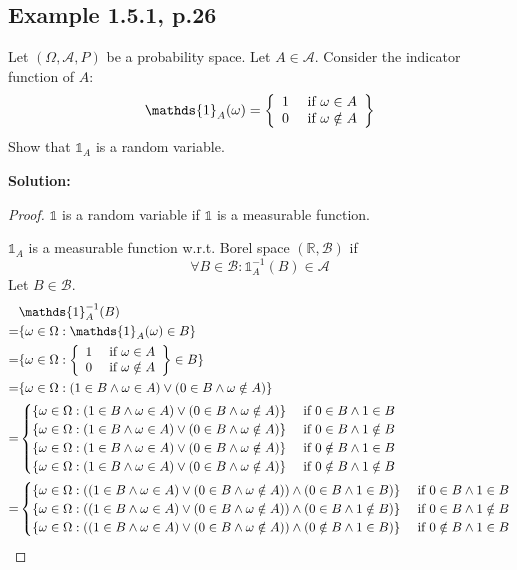 \documentclass{article}
\begin{document}
\subsection{Example 1.5.1, p.26}

Let \((\Omega,\mathcal{A},P)\) be a probability space.
Let \(A\in \mathcal{A}\). Consider the indicator function of \(A\):
\[\mathds{1}_A(\omega)=\casesiie{1}{\omega\in A}{0}{\omega\notin A}\]
Show that \(\mathds{1}_A\) is a random variable.

\textbf{Solution:}
\begin{proof}
\(\mathds{1}\) is a random variable if \(\mathds{1}\) is a measurable function.

\(\mathds{1}_A\) is a measurable function w.r.t. Borel space \((\mathbb{R}, \mathcal{B})\) if
\[\forall B \in \mathcal{B}: \mathds{1}_A^{-1}(B)\in \mathcal{A}\]
Let \(B \in \mathcal{B}\).
\begin{align*}
     & \mathds{1}^{-1}_A(B) \\
    =& \{\omega\in\Omega:\mathds{1}_A(\omega)\in B\} \\
    =& \{\omega\in\Omega:\casesiie{1}{\omega\in A}{0}{\omega\notin A}\in B\} \\
    =& \{\omega\in\Omega:(1\in B\wedge \omega\in A)\vee (0\in B\wedge \omega \notin A)\} \\
    =& \begin{cases}
    \{\omega\in\Omega:(1\in B\wedge \omega\in A)\vee (0\in B\wedge \omega \notin A)\}&\text{ if }0\in B\wedge 1\in B\\
    \{\omega\in\Omega:(1\in B\wedge \omega\in A)\vee (0\in B\wedge \omega \notin A)\}&\text{ if }0\in B\wedge 1\notin B\\
    \{\omega\in\Omega:(1\in B\wedge \omega\in A)\vee (0\in B\wedge \omega \notin A)\}&\text{ if }0\notin B\wedge 1\in B\\
    \{\omega\in\Omega:(1\in B\wedge \omega\in A)\vee (0\in B\wedge \omega \notin A)\}&\text{ if }0\notin B\wedge 1\notin B
    \end{cases} \\
    =& \begin{cases}
    \{\omega\in\Omega:((1\in B\wedge \omega\in A)\vee (0\in B\wedge \omega \notin A))\wedge (0\in B\wedge 1\in B)\}&\text{ if }0\in B\wedge 1\in B\\
    \{\omega\in\Omega:((1\in B\wedge \omega\in A)\vee (0\in B\wedge \omega \notin A))\wedge (0\in B\wedge 1\notin B)\}&\text{ if }0\in B\wedge 1\notin B\\
    \{\omega\in\Omega:((1\in B\wedge \omega\in A)\vee (0\in B\wedge \omega \notin A))\wedge (0\notin B\wedge 1\in B)\}&\text{ if }0\notin B\wedge 1\in B\\

\end{cases}
\end{align*}
\end{proof}
\end{document}
